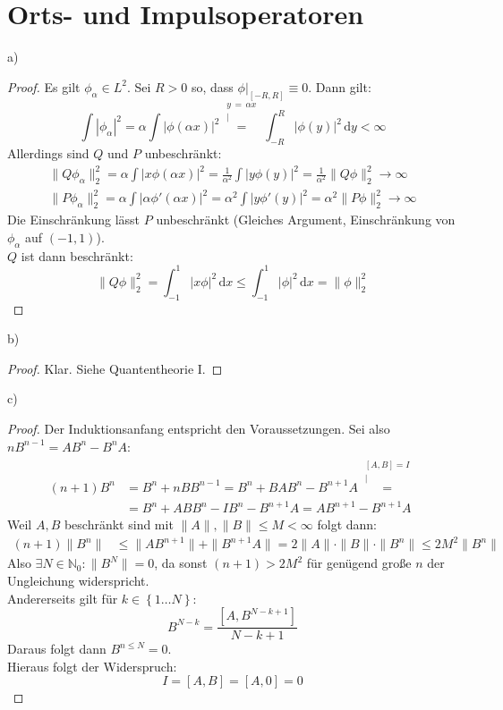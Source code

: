 \documentclass[a4paper,12pt]{article}
\newcommand{\kom}{}
\newcommand{\intx}{}
\newcommand{\klam}{}
\newcommand{\klammer}{}
\begin{document}
\section{Orts- und Impulsoperatoren}
a)
\begin{proof}
Es gilt $\phi_\alpha\in L^2$. Sei $R>0$ so, dass $\phi\vert_{[-R,R]}\equiv 0$. Dann gilt:
$$\int |\phi_\alpha|^2=\alpha\int|\phi(\alpha x)|^2\kom\overset{\substack{{y\,=\,\alpha x} \\ |}}{=}\intx\int_{-R}^{R}|\phi(y)|^2\,\mathrm{d}y<\infty $$
Allerdings sind $Q$ und $P$ unbeschränkt:
\begin{align*}
\|Q\phi_\alpha\|_2^2=\alpha\int |x\phi(\alpha x)|^2=\frac{1}{\alpha^2}\int |y\phi(y)|^2=\frac{1}{\alpha^2}\|Q\phi\|_2^2\rightarrow\infty \\
\|P\phi_\alpha\|_2^2=\alpha\int |\alpha\phi'(\alpha x)|^2=\alpha^2\int |y\phi'(y)|^2=\alpha^2\|P\phi\|_2^2\rightarrow\infty
\end{align*}
Die Einschränkung lässt $P$ unbeschränkt (Gleiches Argument, Einschränkung von $\phi_\alpha$ auf $(-1, 1)$). \\
$Q$ ist dann beschränkt:
$$\|Q\phi\|_2^2=\intx\int_{-1}^{1}|x\phi|^2\,\mathrm{d}x\le\intx\int_{-1}^{1}|\phi|^2\,\mathrm{d}x=\|\phi\|_2^2$$
\end{proof}
b)
\begin{proof}
Klar. Siehe Quantentheorie I.
\end{proof}
c)
\begin{proof}
Der Induktionsanfang entspricht den Voraussetzungen. Sei also $nB^{n-1}=AB^n-B^nA$:
\begin{align*}
(n+1)B^n&=B^n+nBB^{n-1}=B^n+BAB^n-B^{n+1}A\kom\overset{\substack{{[A,B]=I} \\ |}}{=}\\
&=B^n+ABB^n-IB^n-B^{n+1}A=AB^{n+1}-B^{n+1}A
\end{align*}
Weil $A,B$ beschränkt sind mit $\|A\|,\|B\|\le M<\infty$ folgt dann:
\begin{align*}
(n+1)\|B^n\|&\le \|AB^{n+1}\|+\|B^{n+1}A\|=2\|A\|\cdot\|B\|\cdot\|B^n\|\le 2M^2\|B^n\|
\end{align*}
Also $\exists N\in\mathbb{N}_0:\|B^N\|=0$, da sonst $(n+1)>2M^2$ für genügend große $n$ der Ungleichung widerspricht. \\
Andererseits gilt für $k\in\klammer\left\{ {1\dots N} \right\}$:
$$B^{N-k}=\frac{\klam\left[ {A, B^{N-k+1}} \right]}{N-k+1}$$
Daraus folgt dann $B^{n\le N}=0$. \\
Hieraus folgt der Widerspruch:
$$I=\klam\left[ {A,B} \right]=\klam\left[ {A, 0} \right]=0$$
\end{proof}
\end{document}
